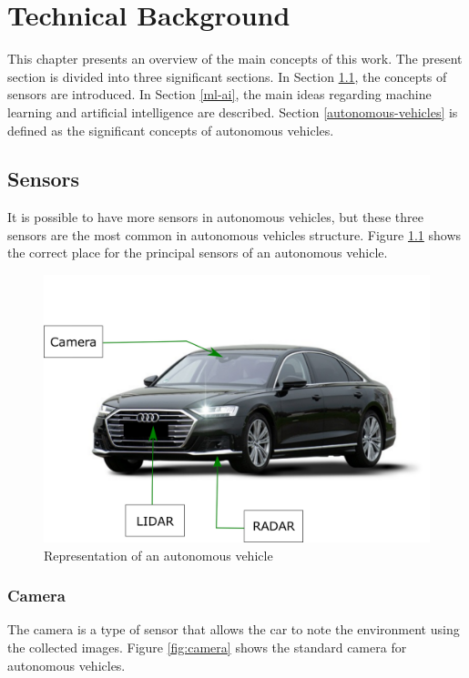 \chapter{Technical Background}
\label{capitulo3}

This chapter presents an overview of the main concepts of this work. The present section is divided into three significant sections. In Section \ref{sensors}, the concepts of sensors are introduced. In Section \ref{ml-ai}, the main ideas regarding machine learning and artificial intelligence are described. Section \ref{autonomous-vehicles} is defined as the significant concepts of autonomous vehicles.

\section{Sensors}\label{sensors}

It is possible to have more sensors in autonomous vehicles, but these three sensors are the most common in autonomous vehicles structure. Figure \ref{fig:autonomous-vehicles} shows the correct place for the principal sensors of an autonomous vehicle.


\begin{figure}[H]
\centering
\includegraphics[scale=0.7]{imagens/image823.png}
\caption{Representation of an autonomous vehicle}
\label{fig:autonomous-vehicles}
\end{figure}


\subsection{Camera}
The camera is a type of sensor that allows the car to note the environment using the collected images. Figure \ref{fig:camera} shows the standard camera for autonomous vehicles.

